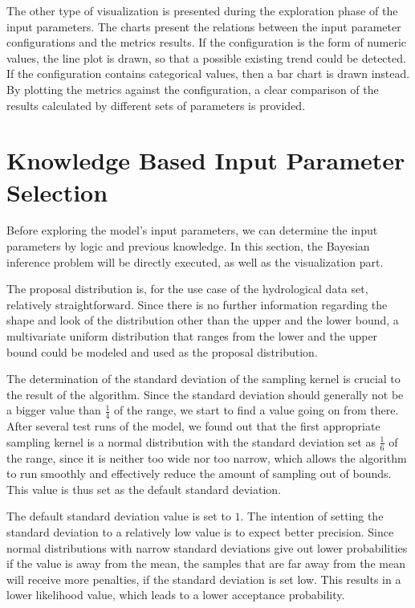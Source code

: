 The other type of visualization is presented during the exploration phase of the input parameters. The charts present the relations between the input parameter configurations and the metrics results. If the configuration is the form of numeric values, the line plot is drawn, so that a possible existing trend could be detected. If the configuration contains categorical values, then a bar chart is drawn instead. By plotting the metrics against the configuration, a clear comparison of the results calculated by different sets of parameters is provided.

\section{Knowledge Based Input Parameter Selection}

Before exploring the model's input parameters, we can determine the input parameters by logic and previous knowledge. In this section, the Bayesian inference problem will be directly executed, as well as the visualization part.

The proposal distribution is, for the use case of the hydrological data set, relatively straightforward. Since there is no further information regarding the shape and look of the distribution other than the upper and the lower bound, a multivariate uniform distribution that ranges from the lower and the upper bound could be modeled and used as the proposal distribution.

The determination of the standard deviation of the sampling kernel is crucial to the result of the algorithm. Since the standard deviation should generally not be a bigger value than $\frac 1 4$ of the range,\cite{good_standard_deviation} we start to find a value going on from there. After several test runs of the model, we found out that the first appropriate sampling kernel is a normal distribution with the standard deviation set as $\frac 1 6$ of the range, since it is neither too wide nor too narrow, which allows the algorithm to run smoothly and effectively reduce the amount of sampling out of bounds. This value is thus set as the default standard deviation.

The default standard deviation value is set to $1$. The intention of setting the standard deviation to a relatively low value is to expect better precision. Since normal distributions with narrow standard deviations give out lower probabilities if the value is away from the mean, the samples that are far away from the mean will receive more penalties, if the standard deviation is set low. This results in a lower likelihood value, which leads to a lower acceptance probability.

